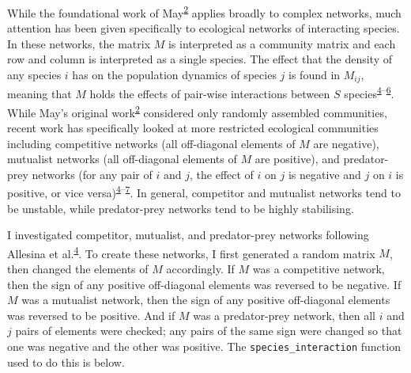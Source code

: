 \documentclass[]{article}
\begin{document}
While the foundational work of
May\textsuperscript{\protect\hyperlink{ref-May1972}{2}} applies broadly
to complex networks, much attention has been given specifically to
ecological networks of interacting species. In these networks, the
matrix \(M\) is interpreted as a community matrix and each row and
column is interpreted as a single species. The effect that the density
of any species \(i\) has on the population dynamics of species \(j\) is
found in \(M_{ij}\), meaning that \(M\) holds the effects of pair-wise
interactions between \(S\)
species\textsuperscript{\protect\hyperlink{ref-Allesina2012}{4}--\protect\hyperlink{ref-Tang2014b}{6}}.
While May's original
work\textsuperscript{\protect\hyperlink{ref-May1972}{2}} considered only
randomly assembled communities, recent work has specifically looked at
more restricted ecological communities including competitive networks
(all off-diagonal elements of \(M\) are negative), mutualist networks
(all off-diagonal elements of \(M\) are positive), and predator-prey
networks (for any pair of \(i\) and \(j\), the effect of \(i\) on \(j\)
is negative and \(j\) on \(i\) is positive, or vice
versa)\textsuperscript{\protect\hyperlink{ref-Allesina2012}{4}--\protect\hyperlink{ref-Allesina2011}{7}}.
In general, competitor and mutualist networks tend to be unstable, while
predator-prey networks tend to be highly stabilising.

I investigated competitor, mutualist, and predator-prey networks
following Allesina et
al.\textsuperscript{\protect\hyperlink{ref-Allesina2012}{4}}. To create
these networks, I first generated a random matrix \(M\), then changed
the elements of \(M\) accordingly. If \(M\) was a competitive network,
then the sign of any positive off-diagonal elements was reversed to be
negative. If \(M\) was a mutualist network, then the sign of any
positive off-diagonal elements was reversed to be positive. And if \(M\)
was a predator-prey network, then all \(i\) and \(j\) pairs of elements
were checked; any pairs of the same sign were changed so that one was
negative and the other was positive. The \texttt{species\_interaction}
function used to do this is below.
\end{document}
